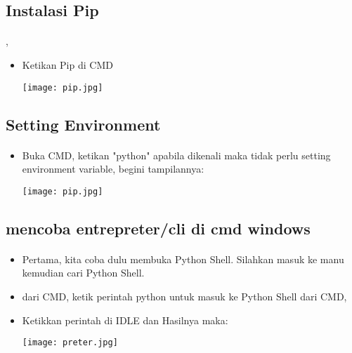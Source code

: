 \documentclass{article}
\begin{document}
\subsection{Instalasi Pip}
\paragraph{},
\begin{itemize}
    \item Ketikan Pip di CMD
    \begin{center}
        \texttt{[image: pip.jpg]}
    \end{center}
    
\end{itemize}

\subsection{Setting Environment}
\paragraph{}
\begin{itemize}
    \item Buka CMD, ketikan "python" apabila dikenali maka tidak perlu setting environment variable, begini tampilannya:
    \begin{center}
        \texttt{[image: pip.jpg]}
    \end{center}
    
\end{itemize}

\subsection{ mencoba entrepreter/cli di cmd windows}
\paragraph{}
\begin{itemize}
    \item Pertama, kita coba dulu membuka Python Shell. Silahkan masuk ke manu kemudian cari Python Shell.\\
    \item dari CMD, ketik perintah python untuk masuk ke Python Shell dari CMD,\\
    \item Ketikkan perintah di IDLE dan Hasilnya maka:
    \begin{center}
        \texttt{[image: preter.jpg]}
    \end{center}
\end{itemize}
\end{document}
